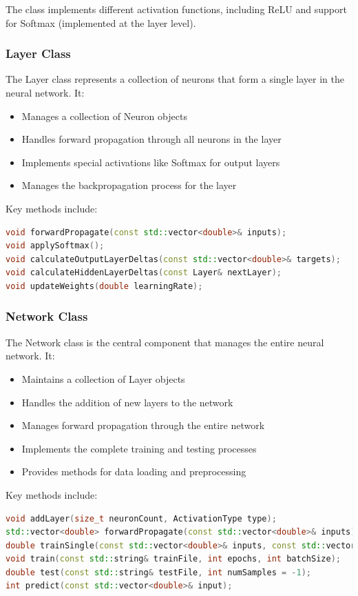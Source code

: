 \documentclass[12pt]{article}
\begin{document}
The class implements different activation functions, including ReLU and support for Softmax (implemented at the layer level).

\subsubsection{Layer Class}

The Layer class represents a collection of neurons that form a single layer in the neural network. It:

\begin{itemize}
    \item Manages a collection of Neuron objects
    \item Handles forward propagation through all neurons in the layer
    \item Implements special activations like Softmax for output layers
    \item Manages the backpropagation process for the layer
\end{itemize}

Key methods include:
\begin{lstlisting}[language=C++]
void forwardPropagate(const std::vector<double>& inputs);
void applySoftmax();
void calculateOutputLayerDeltas(const std::vector<double>& targets);
void calculateHiddenLayerDeltas(const Layer& nextLayer);
void updateWeights(double learningRate);
\end{lstlisting}

\subsubsection{Network Class}

The Network class is the central component that manages the entire neural network. It:

\begin{itemize}
    \item Maintains a collection of Layer objects
    \item Handles the addition of new layers to the network
    \item Manages forward propagation through the entire network
    \item Implements the complete training and testing processes
    \item Provides methods for data loading and preprocessing
\end{itemize}

Key methods include:
\begin{lstlisting}[language=C++]
void addLayer(size_t neuronCount, ActivationType type);
std::vector<double> forwardPropagate(const std::vector<double>& inputs);
double trainSingle(const std::vector<double>& inputs, const std::vector<double>& targets);
void train(const std::string& trainFile, int epochs, int batchSize);
double test(const std::string& testFile, int numSamples = -1);
int predict(const std::vector<double>& input);
\end{lstlisting}
\end{document}
